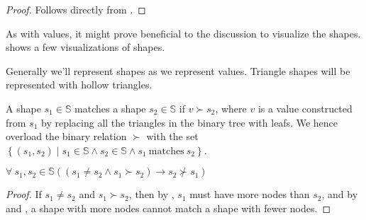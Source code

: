 \begin{proof} Follows directly from .
\end{proof} 

As with values, it might prove beneficial to the discussion to visualize the
shapes.  shows a few visualizations
of shapes. 

\begin{definition} Generally we'll represent shapes as we represent values.
Triangle shapes will be represented with hollow triangles. \end{definition}


\begin{definition}\label{definition:shape-matches-shape} A shape
$s_1\in\mathbb{S}$ matches a shape $s_2\in\mathbb{S}$ if $v\succ s_2$, where
$v$ is a value constructed from $s_1$ by replacing all the triangles in the
binary tree with leafs. We hence overload the binary relation $\succ$ with the
set $\left\{(s_1,s_2)\mid s_1\in\mathbb{S} \wedge s_2\in\mathbb{S} \wedge s_1\
\text{matches}\ s_2\right\}$.\end{definition}

\begin{lemma} $\forall\ s_1, s_2 \in \mathbb{S} \left(\left(s_1\neq s_2 \wedge
s_1\succ s_2\right) \rightarrow s_2\nsucc s_1\right)$\end{lemma}

\begin{proof}If $s_1\neq s_2$ and $s_1\succ s_2$, then by
, $s_1$ must have more nodes than $s_2$,
and by \referToDefinition{value-matches-shape} and
, a shape with more nodes cannot match a
shape with fewer nodes.\end{proof}


